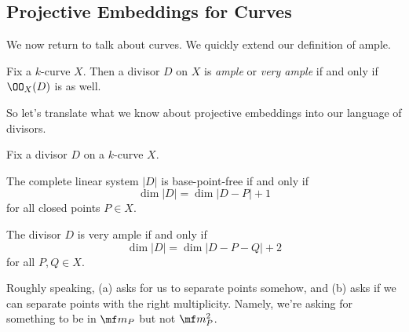 \documentclass[../notes.tex]{subfiles}
\begin{document}
\subsection{Projective Embeddings for Curves}
We now return to talk about curves. We quickly extend our definition of ample.
\begin{defihelper}  
	Fix a $k$-curve $X$. Then a divisor $D$ on $X$ is \textit{ample} or \textit{very ample} if and only if $\OO_X(D)$ is as well.
\end{defihelper}
So let's translate what we know about projective embeddings into our language of divisors.
\begin{prop} \label{prop:div-to-proj-embed}
	Fix a divisor $D$ on a $k$-curve $X$.
	\begin{listalph}
		\item The complete linear system $|D|$ is base-point-free if and only if
		\[\dim|D|=\dim|D-P|+1\]
		for all closed points $P\in X$.
		\item The divisor $D$ is very ample if and only if
		\[\dim|D|=\dim|D-P-Q|+2\]
		for all $P,Q\in X$.
	\end{listalph}
\end{prop}
Roughly speaking, (a) asks for us to separate points somehow, and (b) asks if we can separate points with the right multiplicity. Namely, we're asking for something to be in $\mf m_P$ but not $\mf m_P^2$.
\end{document}
